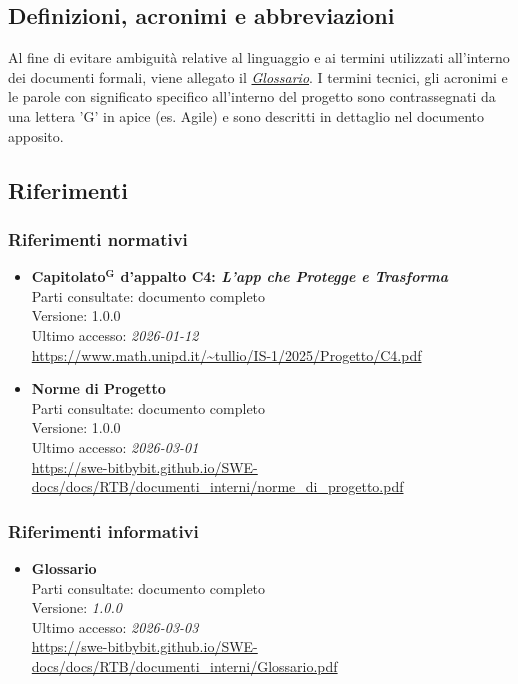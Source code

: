 \documentclass[a4paper,12pt]{article}
\newcommand{\term}[1]{\textbf{#1}$^\mathbf{G}$}
\begin{document}

\subsection{Definizioni, acronimi e abbreviazioni} \label{sec:definizioni_acronimi_abbreviazioni}

Al fine di evitare ambiguità relative al linguaggio e ai termini utilizzati all'interno dei documenti formali, viene allegato il \href{https://swe-bitbybit.github.io/SWE-docs/docs/RTB/documenti_interni/Glossario.pdf}{\textit{Glossario}}.
I termini tecnici, gli acronimi e le parole con significato specifico all'interno del progetto sono contrassegnati da una lettera 'G' in apice (es. Agile) e sono descritti in dettaglio nel documento apposito.


\subsection{Riferimenti} \label{sec:riferimenti}

\subsubsection{Riferimenti normativi}\label{sec:riferimenti_normativi}
\begin{itemize}
\item \textbf{\term{Capitolato} d'appalto C4: \emph{L'app che Protegge e Trasforma}}\\
Parti consultate: documento completo\\
Versione: 1.0.0\\
Ultimo accesso: \textit{2026-01-12}\\
\url{https://www.math.unipd.it/~tullio/IS-1/2025/Progetto/C4.pdf}

\item \textbf{Norme di Progetto}\\
Parti consultate: documento completo\\
Versione: 1.0.0\\
Ultimo accesso: \textit{2026-03-01}\\
\url{https://swe-bitbybit.github.io/SWE-docs/docs/RTB/documenti_interni/norme_di_progetto.pdf}
\end{itemize}


\subsubsection{Riferimenti informativi} \label{sec:riferimenti_informativi}
\begin{itemize}
    \item \textbf{Glossario}\\
        Parti consultate: documento completo\\
        Versione: \textit{1.0.0}\\
        Ultimo accesso: \textit{2026-03-03}\\
        \url{https://swe-bitbybit.github.io/SWE-docs/docs/RTB/documenti_interni/Glossario.pdf}
\end{itemize}
\end{document}
